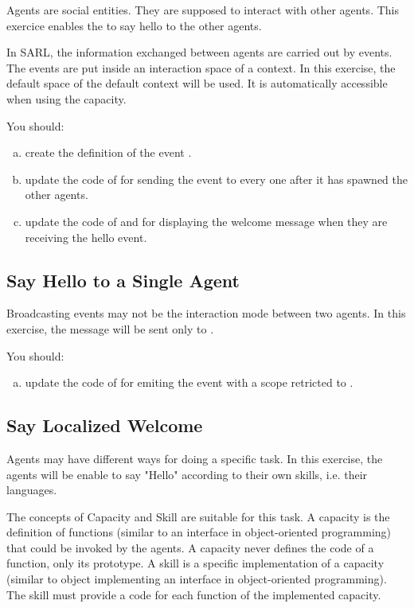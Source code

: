 \documentclass[english]{utbmciadreport}
\begin{document}
Agents are social entities. They are supposed to interact with other agents.
This exercice enables the  to say hello to the other agents.

In SARL, the information exchanged between agents are carried out by events.
The events are put inside an interaction space of a context.
In this exercise, the default space of the default context will be used.
It is automatically accessible when using the  capacity.

You should:
\begin{enumerate}[a)]
\item create the definition of the event .
\item update the code of  for sending the event to every one after it has spawned the other agents.
\item update the code of  and  for displaying the welcome message when they are receiving the hello event.
\end{enumerate}

\subsection{Say Hello to a Single Agent}

Broadcasting events may not be the interaction mode between two agents.
In this exercise, the  message will be sent only to .

You should:
\begin{enumerate}[a)]
\item update the code of  for emiting the event with a scope retricted to .
\end{enumerate}

\subsection{Say Localized Welcome}

Agents may have different ways for doing a specific task.
In this exercise, the agents will be enable to say "Hello" according to their own skills, i.e. their languages.

The concepts of Capacity and Skill are suitable for this task.
A capacity is the definition of functions (similar to an interface in object-oriented programming) that could be invoked by the agents. A capacity never defines the code of a function, only its prototype.
A skill is a specific implementation of a capacity (similar to object implementing an interface in object-oriented programming). The skill must provide a code for each function of the implemented capacity.
\end{document}
